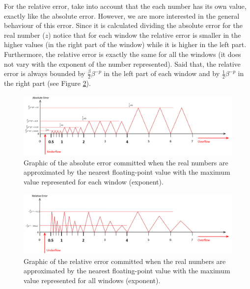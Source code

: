 For the relative error, take into account that the each number has its own value, exactly like the absolute error. However, we are more 
interested in the general behaviour of this error. Since it is calculated dividing the absolute error for the real number ($z$) notice that 
for each window the relative error is smaller in the higher values (in the right part of the window) while it is higher in the left part. 
Furthermore, the relative error is exactly the same for all the windows (it does not vary with the exponent of the number represented). Said 
that, the relative error is always bounded by $\frac{\beta}{2}\beta^{-p}$ in the left part of each window and by $ \frac{1}{2}\beta^{-p} $ in 
the right part (see Figure \ref{fig:RelErrorGraph}). 

\begin{figure}[h]
    \centering
    \includegraphics[width= \textwidth]{./doc/Figures/AbsErrorGraph.png}
    \caption{Graphic of the absolute error committed when the real numbers are approximated by the nearest floating-point value with the 
    maximum value represented for each window (exponent).}
    \label{fig:AbsErrorGraph}
\end{figure}

\begin{figure}[h]
    \centering
    \includegraphics[width= \textwidth]{./doc/Figures/RelErrorGraph.png}
    \caption{Graphic of the relative error committed when the real numbers are approximated by the nearest floating-point value with the 
    maximum value represented for all windows (exponent).}
    \label{fig:RelErrorGraph}
\end{figure}

